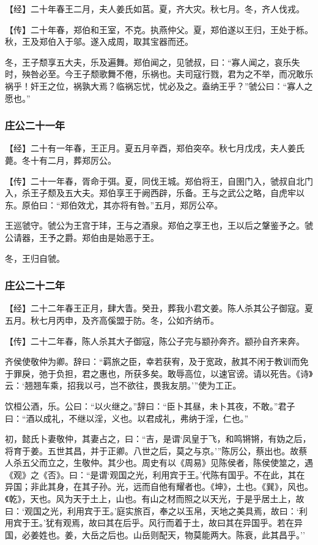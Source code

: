 \documentclass[]{article}
\begin{document}
【经】二十年春王二月，夫人姜氏如莒。夏，齐大灾。秋七月。冬，齐人伐戎。

【传】二十年春，郑伯和王室，不克。执燕仲父。夏，郑伯遂以王归，王处于栎。秋，王及郑伯入于邬。遂入成周，取其宝器而还。

冬，王子颓享五大夫，乐及遍舞。郑伯闻之，见虢叔，曰：``寡人闻之，哀乐失时，殃咎必至。今王子颓歌舞不倦，乐祸也。夫司寇行戮，君为之不举，而况敢乐祸乎！奸王之位，祸孰大焉？临祸忘忧，忧必及之。盍纳王乎？''虢公曰：``寡人之愿也。''

\hypertarget{header-n511}{%
\subsubsection{庄公二十一年}\label{header-n511}}

【经】二十有一年春，王正月。夏五月辛酉，郑伯突卒。秋七月戊戌，夫人姜氏薨。冬十有二月，葬郑厉公。

【传】二十一年春，胥命于弭。夏，同伐王城。郑伯将王，自圉门入，虢叔自北门入，杀王子颓及五大夫。郑伯享王于阙西辟，乐备。王与之武公之略，自虎牢以东。原伯曰：``郑伯效尤，其亦将有咎。''五月，郑厉公卒。

王巡虢守。虢公为王宫于玤，王与之酒泉。郑伯之享王也，王以后之鞶鉴予之。虢公请器，王予之爵。郑伯由是始恶于王。

冬，王归自虢。

\hypertarget{header-n518}{%
\subsubsection{庄公二十二年}\label{header-n518}}

【经】二十二年春王正月，肆大眚。癸丑，葬我小君文姜。陈人杀其公子御寇。夏五月。秋七月丙申，及齐高傒盟于防。冬，公如齐纳币。

【传】二十二年春，陈人杀其大子御寇，陈公子完与颛孙奔齐。颛孙自齐来奔。

齐侯使敬仲为卿。辞曰：``羁旅之臣，幸若获宥，及于宽政，赦其不闲于教训而免于罪戾，弛于负担，君之惠也，所获多矣。敢辱高位，以速官谤。请以死告。《诗》云：`翘翘车乘，招我以弓，岂不欲往，畏我友朋。'''使为工正。

饮桓公酒，乐。公曰：``以火继之。''辞曰：``臣卜其昼，未卜其夜，不敢。''君子曰：``酒以成礼，不继以淫，义也。以君成礼，弗纳于淫，仁也。''

初，懿氏卜妻敬仲，其妻占之，曰：``吉，是谓`凤皇于飞，和鸣锵锵，有妫之后，将育于姜。五世其昌，并于正卿。八世之后，莫之与京。'''陈厉公，蔡出也。故蔡人杀五父而立之，生敬仲。其少也。周史有以《周易》见陈侯者，陈侯使筮之，遇《观》之《否》。曰：``是谓`观国之光，利用宾于王。'代陈有国乎。不在此，其在异国；非此其身，在其子孙。光，远而自他有耀者也。《坤》，土也。《巽》，风也。《乾》，天也。风为天于土上，山也。有山之材而照之以天光，于是乎居土上，故曰：`观国之光，利用宾于王。'庭实旅百，奉之以玉帛，天地之美具焉，故曰：`利用宾于王。'犹有观焉，故曰其在后乎。风行而着于土，故曰其在异国乎。若在异国，必姜姓也。姜，大岳之后也。山岳则配天，物莫能两大。陈衰，此其昌乎。''
\end{document}
